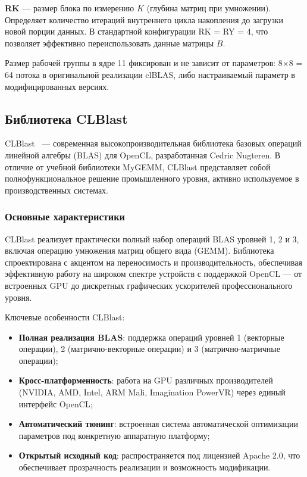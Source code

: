 \textbf{RK} --- размер блока по измерению $K$ (глубина матриц при умножении). Определяет количество итераций внутреннего цикла накопления до загрузки новой порции данных. В стандартной конфигурации RK = RY = 4, что позволяет эффективно переиспользовать данные матрицы $B$.

Размер рабочей группы в ядре 11 фиксирован и не зависит от параметров: 8×8 = 64 потока в оригинальной реализации clBLAS, либо настраиваемый параметр в модифицированных версиях.

\subsection{Библиотека CLBlast}

CLBlast~\cite{clblast} --- современная высокопроизводительная библиотека базовых операций линейной алгебры (BLAS) для OpenCL, разработанная Cedric Nugteren. В отличие от учебной библиотеки MyGEMM, CLBlast представляет собой полнофункциональное решение промышленного уровня, активно используемое в производственных системах.

\subsubsection{Основные характеристики}

CLBlast реализует практически полный набор операций BLAS уровней 1, 2 и 3, включая операцию умножения матриц общего вида (GEMM). Библиотека спроектирована с акцентом на переносимость и производительность, обеспечивая эффективную работу на широком спектре устройств с поддержкой OpenCL --- от встроенных GPU до дискретных графических ускорителей профессионального уровня.

Ключевые особенности CLBlast:

\begin{itemize}
    \item \textbf{Полная реализация BLAS}: поддержка операций уровней 1 (векторные операции), 2 (матрично-векторные операции) и 3 (матрично-матричные операции);
    \item \textbf{Кросс-платформенность}: работа на GPU различных производителей (NVIDIA, AMD, Intel, ARM Mali, Imagination PowerVR) через единый интерфейс OpenCL;
    \item \textbf{Автоматический тюнинг}: встроенная система автоматической оптимизации параметров под конкретную аппаратную платформу;
    \item \textbf{Открытый исходный код}: распространяется под лицензией Apache 2.0, что обеспечивает прозрачность реализации и возможность модификации.
\end{itemize}

